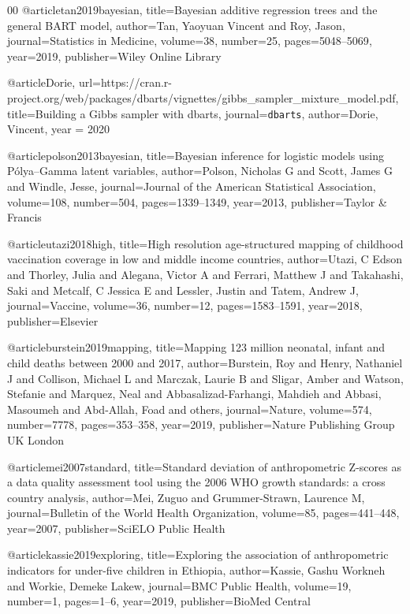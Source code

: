 \documentclass[preprint,12pt]{elsarticle}
\begin{document}
\begin{thebibliography}{00}
@article{tan2019bayesian,
  title={Bayesian additive regression trees and the general {BART} model},
  author={Tan, Yaoyuan Vincent and Roy, Jason},
  journal={Statistics in Medicine},
  volume={38},
  number={25},
  pages={5048--5069},
  year={2019},
  publisher={Wiley Online Library}
}

@article{Dorie, 
   url={https://cran.r-project.org/web/packages/dbarts/vignettes/gibbs_sampler_mixture_model.pdf}, 
   title={Building a Gibbs sampler with dbarts},
   journal={\texttt{dbarts}}, 
   author={Dorie, Vincent},
   year = {2020}} 

@article{polson2013bayesian,
  title={Bayesian inference for logistic models using P{\'o}lya--Gamma latent variables},
  author={Polson, Nicholas G and Scott, James G and Windle, Jesse},
  journal={Journal of the American Statistical Association},
  volume={108},
  number={504},
  pages={1339--1349},
  year={2013},
  publisher={Taylor \& Francis}
}

@article{utazi2018high,
  title={High resolution age-structured mapping of childhood vaccination coverage in low and middle income countries},
  author={Utazi, C Edson and Thorley, Julia and Alegana, Victor A and Ferrari, Matthew J and Takahashi, Saki and Metcalf, C Jessica E and Lessler, Justin and Tatem, Andrew J},
  journal={Vaccine},
  volume={36},
  number={12},
  pages={1583--1591},
  year={2018},
  publisher={Elsevier}
}

@article{burstein2019mapping,
  title={Mapping 123 million neonatal, infant and child deaths between 2000 and 2017},
  author={Burstein, Roy and Henry, Nathaniel J and Collison, Michael L and Marczak, Laurie B and Sligar, Amber and Watson, Stefanie and Marquez, Neal and Abbasalizad-Farhangi, Mahdieh and Abbasi, Masoumeh and Abd-Allah, Foad and others},
  journal={Nature},
  volume={574},
  number={7778},
  pages={353--358},
  year={2019},
  publisher={Nature Publishing Group UK London}
}



@article{mei2007standard,
  title={{Standard deviation of anthropometric Z-scores as a data quality assessment tool using the 2006 WHO growth standards: a cross country analysis}},
  author={Mei, Zuguo and Grummer-Strawn, Laurence M},
  journal={Bulletin of the World Health Organization},
  volume={85},
  pages={441--448},
  year={2007},
  publisher={SciELO Public Health}
}

@article{kassie2019exploring,
  title={Exploring the association of anthropometric indicators for under-five children in {E}thiopia},
  author={Kassie, Gashu Workneh and Workie, Demeke Lakew},
  journal={BMC Public Health},
  volume={19},
  number={1},
  pages={1--6},
  year={2019},
  publisher={BioMed Central}
}


\end{thebibliography}
\end{document}
